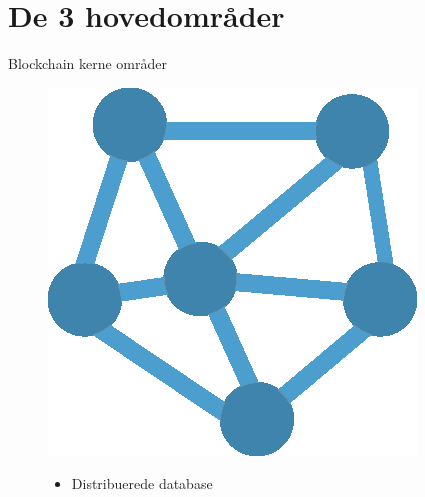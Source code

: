\documentclass[12pt,t]{beamer}
\begin{document}
\section{De 3 hovedområder}
	\begin{frame}[plain]{Blockchain kerne områder}
	\hfill \break
	\hfill \break
	\begin{figure}
		\begin{minipage}[c]{0.1\textwidth}
			\includegraphics[width=\textwidth]{disnet.png}
		\end{minipage}
		\begin{minipage}[c]{0.5\textwidth}
			\begin{itemize}
				\item Distribuerede database
			\end{itemize}
		\end{minipage}
	\end{figure}


\end{frame}
\end{document}
